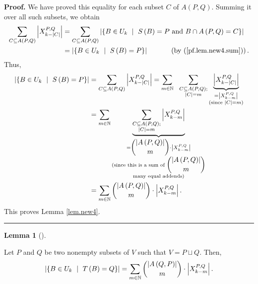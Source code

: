 \documentclass[numbers=enddot,12pt,final,onecolumn,notitlepage]{scrartcl}%
\theoremstyle{definition}
\newtheorem{lem}[theo]{Lemma}
\newenvironment{lemma}[1][]
{\begin{lem}[#1]\begin{leftbar}}
{\end{leftbar}\end{lem}}
\newenvironment{proof}[1][Proof]{\noindent\textbf{#1.} }{\ \rule{0.5em}{0.5em}}
\let\sumnonlimits\sum
\renewcommand{\sum}{\sumnonlimits\limits}
\theoremstyle{plainsl}
\begin{document}
\begin{proof}
We have proved this equality for each subset $C$ of $A\left(  P,Q\right)  $.
Summing it over all such subsets, we obtain%
\begin{align*}
\sum_{C\subseteq A\left(  P,Q\right)  }\left\vert X_{k-|C|}^{P,Q}\right\vert
&  =\sum_{C\subseteq A\left(  P,Q\right)  }\left\vert \left\{  B\in
U_{k}\ \mid\ S\left(  B\right)  =P\text{ and }B\cap A\left(  P,Q\right)
=C\right\}  \right\vert \\
&  =\left\vert \left\{  B\in U_{k}\ \mid\ S\left(  B\right)  =P\right\}
\right\vert \ \ \ \ \ \ \ \ \ \ \left(  \text{by (\ref{pf.lem.new4.sum}%
)}\right)  .
\end{align*}
Thus,%
\begin{align*}
\left\vert \left\{  B\in U_{k}\ \mid\ S\left(  B\right)  =P\right\}
\right\vert  &  =\sum_{C\subseteq A\left(  P,Q\right)  }\left\vert
X_{k-|C|}^{P,Q}\right\vert =\sum_{m\in\mathbb{N}}\ \ \sum
_{\substack{C\subseteq A\left(  P,Q\right)  ;\\\left\vert C\right\vert
=m}}\underbrace{\left\vert X_{k-|C|}^{P,Q}\right\vert }_{\substack{=\left\vert
X_{k-m}^{P,Q}\right\vert \\\text{(since }\left\vert C\right\vert =m\text{)}%
}}\\
&  =\sum_{m\in\mathbb{N}}\underbrace{\sum_{\substack{C\subseteq A\left(
P,Q\right)  ;\\\left\vert C\right\vert =m}}\left\vert X_{k-m}^{P,Q}\right\vert
}_{\substack{=\dbinom{\left\vert A\left(  P,Q\right)  \right\vert }{m}%
\cdot\left\vert X_{k-m}^{P,Q}\right\vert \\\text{(since this is a sum of
}\dbinom{\left\vert A\left(  P,Q\right)  \right\vert }{m}\\\text{many equal
addends)}}}\\
&  =\sum_{m\in\mathbb{N}}\dbinom{\left\vert A\left(  P,Q\right)  \right\vert
}{m}\cdot\left\vert X_{k-m}^{P,Q}\right\vert .
\end{align*}
This proves Lemma \ref{lem.new4}.
\end{proof}

\begin{lemma}
\label{lem.new5} Let $P$ and $Q$ be two nonempty subsets of $V$ such that
$V=P\sqcup Q$. Then,%
\[
\left\vert \left\{  B\in U_{k}\ \mid\ T\left(  B\right)  =Q\right\}
\right\vert =\sum_{m\in\mathbb{N}}\dbinom{\left\vert A\left(  Q,P\right)
\right\vert }{m}\cdot\left\vert X_{k-m}^{P,Q}\right\vert .
\]

\end{lemma}
\end{document}
